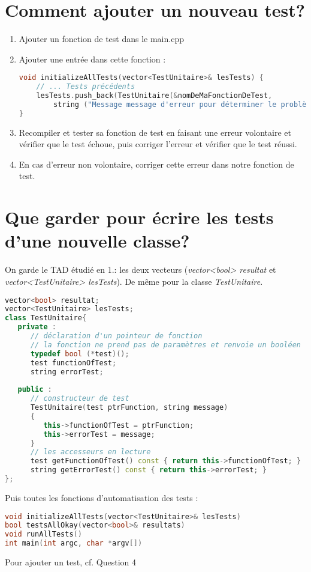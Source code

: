\documentclass{article}
\begin{document}
		\section{Comment ajouter un nouveau test? }
		\begin{enumerate}
			\item  Ajouter un fonction de test dans le main.cpp
			\item  Ajouter une entrée dans cette fonction :
\begin{lstlisting}[language=C++, caption=Initialisation du test]
void initializeAllTests(vector<TestUnitaire>& lesTests) {
	// ... Tests précédents 
	lesTests.push_back(TestUnitaire(&nomDeMaFonctionDeTest, 
		string ("Message message d'erreur pour déterminer le problème"));
}
\end{lstlisting}
	\item  Recompiler et tester sa fonction de test en faisant une erreur volontaire et vérifier que le test échoue, puis corriger l'erreur et vérifier que le test réussi.
	\item  En cas d'erreur non volontaire, corriger cette erreur dans notre fonction de test.
	\end{enumerate}

	\section{Que garder pour écrire les tests d'une nouvelle classe?}
	On garde le TAD étudié en 1.: les deux vecteurs (\textit{vector<bool> resultat} et \textit{vector<TestUnitaire> lesTests}). De même pour la classe \textit{TestUnitaire}.\\
\begin{lstlisting}[language=C++, caption=Classe TestUnitaire  vector resultat et vector lesTests]
vector<bool> resultat;
vector<TestUnitaire> lesTests;
class TestUnitaire{ 
   private :  
      // déclaration d'un pointeur de fonction
      // la fonction ne prend pas de paramètres et renvoie un booléen
      typedef bool (*test)();  
      test functionOfTest;
      string errorTest;
   
   public :
      // constructeur de test
      TestUnitaire(test ptrFunction, string message) 
      {
         this->functionOfTest = ptrFunction;
         this->errorTest = message;
      }
      // les accesseurs en lecture
      test getFunctionOfTest() const { return this->functionOfTest; }
      string getErrorTest() const { return this->errorTest; }
};
\end{lstlisting}
	Puis toutes les fonctions d'automatisation des tests :
\begin{lstlisting}[language=C++, caption=Prototype des fonctions à garder]
void initializeAllTests(vector<TestUnitaire>& lesTests)
bool testsAllOkay(vector<bool>& resultats)
void runAllTests()
int main(int argc, char *argv[])
\end{lstlisting}

	Pour ajouter un test, cf. Question 4
		
			
\end{document}
